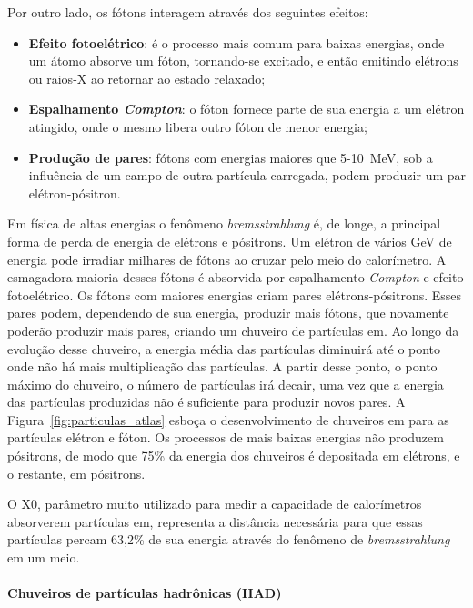 Por outro lado, os fótons interagem através dos seguintes efeitos:

\begin{itemize}
\item \textbf{Efeito fotoelétrico}: é o processo mais comum para baixas
energias, onde um átomo absorve um fóton, tornando-se excitado, e então emitindo
elétrons ou raios-X ao retornar ao estado relaxado;
\item \textbf{Espalhamento \emph{Compton}}: o fóton fornece parte de sua energia
a um elétron atingido, onde o mesmo libera outro fóton de menor energia;
\item \textbf{Produção de pares}: fótons com energias maiores que 5-10~MeV, 
sob a influência de um campo de outra partícula carregada,
podem produzir um par elétron-pósitron.
\end{itemize}

Em física de altas energias o fenômeno \emph{bremsstrahlung} é, de longe, a
principal forma de perda de energia de elétrons e pósitrons. Um elétron
de vários GeV de energia pode irradiar milhares de fótons ao cruzar pelo meio do
calorímetro. A esmagadora maioria desses fótons é absorvida por espalhamento
\emph{Compton} e efeito fotoelétrico. Os fótons com maiores energias
criam pares elétrons-pósitrons. Esses pares podem, dependendo de sua energia, 
produzir mais fótons, que novamente poderão produzir mais pares,
criando um chuveiro de partículas \gls{em}. Ao longo da evolução desse
chuveiro, a energia média das partículas diminuirá até o ponto onde não há mais
multiplicação das partículas. A partir desse ponto, o ponto máximo do chuveiro,
o número de partículas irá decair, uma vez que a energia das partículas
produzidas não é suficiente para produzir novos pares. A
Figura~\ref{fig:particulas_atlas} esboça o desenvolvimento de chuveiros \gls{em} 
para as partículas elétron e fóton. Os processos de mais
baixas energias não produzem pósitrons, de modo que 75\% da energia dos
chuveiros é depositada em elétrons, e o restante, em pósitrons.

O \gls{X0}, parâmetro muito utilizado para medir a capacidade de calorímetros
absorverem partículas \gls{em}, representa a distância necessária para que 
essas partículas percam 63,2\% de sua energia através do fenômeno de
\emph{bremsstrahlung} em um meio.

\paragraph{Chuveiros de partículas hadrônicas (HAD)}
\label{par:chuveiro_had}


